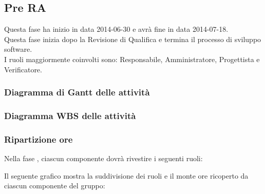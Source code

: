 \subsection{Pre RA}
Questa fase ha inizio in data 2014-06-30 e avrà fine in data 2014-07-18.\\
Questa fase inizia dopo la Revisione di Qualifica e termina il processo di sviluppo software.\\
I ruoli maggiormente coinvolti sono: Responsabile, Amministratore, Progettista e Verificatore.


\subsubsection{Diagramma di Gantt delle attività}

\newpage
\subsubsection{Diagramma WBS delle attività}

\newpage
\subsubsection{Ripartizione ore}

\newpage
Nella fase , ciascun componente dovrà rivestire i seguenti ruoli:

Il seguente grafico mostra la suddivisione dei ruoli e il monte ore ricoperto da ciascun componente del gruppo:
